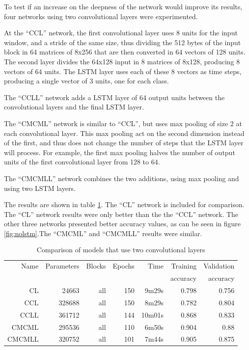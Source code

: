 To test if an increase on the deepness of the network would improve its results, four networks using two convolutional layers were experimented. 

At the ``CCL'' network, the first convolutional layer uses 8 units for the input window, and a stride of the same size, thus dividing the 512 bytes of the input block in 64 matrices of 8x256 that are then converted in 64 vectors of 128 units. The second layer divides the 64x128 input in 8 matrices of 8x128, producing 8 vectors of 64 units. The LSTM layer uses each of these 8 vectors as time steps, producing a single vector of 3 units, one for each class.

The ``CCLL'' network adds a LSTM layer of 64 output units between the convolutional layers and the final LSTM layer.

The ``CMCML'' network is similar to ``CCL'', but uses max pooling of size 2 at each convolutional layer. This max pooling act on the second dimension instead of the first, and thus does not change the number of steps that the LSTM layer will process. For example, the first max pooling halves the number of output units of the first convolutional layer from 128 to 64.

The ``CMCMLL'' network combines the two additions, using max pooling and using two LSTM layers.

The results are shown in table \ref{tab:carving2convs}. The ``CL'' network is included for comparison. The  ``CL'' network results were only better than the the ``CCL'' network. The other three networks presented better accuracy values, as can be seen in figure \ref{fig:nolstm}.The ``CMCML'' and ``CMCMLL'' results were similar.

\begin{table}[!ht]
    \centering
    \caption[Two convolutional layers]{Comparison of models that use two convolutional layers}
    \label{tab:carving2convs}
\begin{tabular}{r|r|r|r|r|r|r}
\hline
Name & Parameters & Blocks & Epochs & Time & Training          & Validation          \\       
     &            &        &        &         &          accuracy &            accuracy \\ \hline\hline

CL	    & 24663	    & all	& 150	& 9m29s	    & 0.798	& 0.756 \\\hline
CCL	    & 328688	& all	& 150	& 8m29s	    & 0.782	& 0.804 \\\hline
CCLL	& 361712	& all	& 144	& 10m01s	& 0.868	& 0.833 \\\hline
CMCML	& 295536	& all	& 110	& 6m50s	    & 0.904	& 0.88 \\\hline
CMCMLL	& 320752	& all	& 101	& 7m44s	    & 0.905	& 0.875 \\\hline
\end{tabular}
\end{table}

